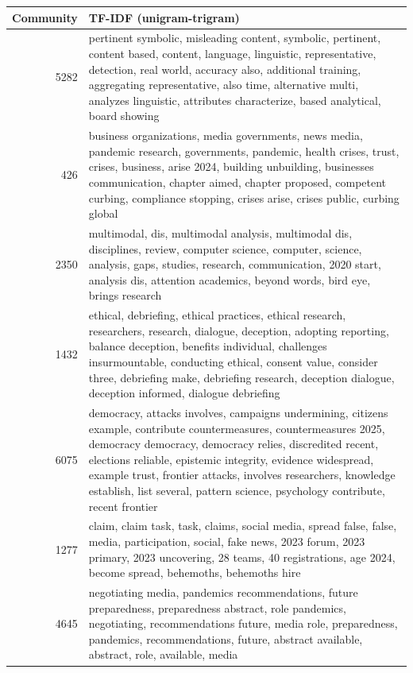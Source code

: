 \begin{tabular}{rl}
\toprule
Community & TF-IDF (unigram-trigram) \\
\midrule
5282 & pertinent symbolic, misleading content, symbolic, pertinent, content based, content, language, linguistic, representative, detection, real world, accuracy also, additional training, aggregating representative, also time, alternative multi, analyzes linguistic, attributes characterize, based analytical, board showing \\
426 & business organizations, media governments, news media, pandemic research, governments, pandemic, health crises, trust, crises, business, arise 2024, building unbuilding, businesses communication, chapter aimed, chapter proposed, competent curbing, compliance stopping, crises arise, crises public, curbing global \\
2350 & multimodal, dis, multimodal analysis, multimodal dis, disciplines, review, computer science, computer, science, analysis, gaps, studies, research, communication, 2020 start, analysis dis, attention academics, beyond words, bird eye, brings research \\
1432 & ethical, debriefing, ethical practices, ethical research, researchers, research, dialogue, deception, adopting reporting, balance deception, benefits individual, challenges insurmountable, conducting ethical, consent value, consider three, debriefing make, debriefing research, deception dialogue, deception informed, dialogue debriefing \\
6075 & democracy, attacks involves, campaigns undermining, citizens example, contribute countermeasures, countermeasures 2025, democracy democracy, democracy relies, discredited recent, elections reliable, epistemic integrity, evidence widespread, example trust, frontier attacks, involves researchers, knowledge establish, list several, pattern science, psychology contribute, recent frontier \\
1277 & claim, claim task, task, claims, social media, spread false, false, media, participation, social, fake news, 2023 forum, 2023 primary, 2023 uncovering, 28 teams, 40 registrations, age 2024, become spread, behemoths, behemoths hire \\
4645 & negotiating media, pandemics recommendations, future preparedness, preparedness abstract, role pandemics, negotiating, recommendations future, media role, preparedness, pandemics, recommendations, future, abstract available, abstract, role, available, media \\

\end{tabular}
